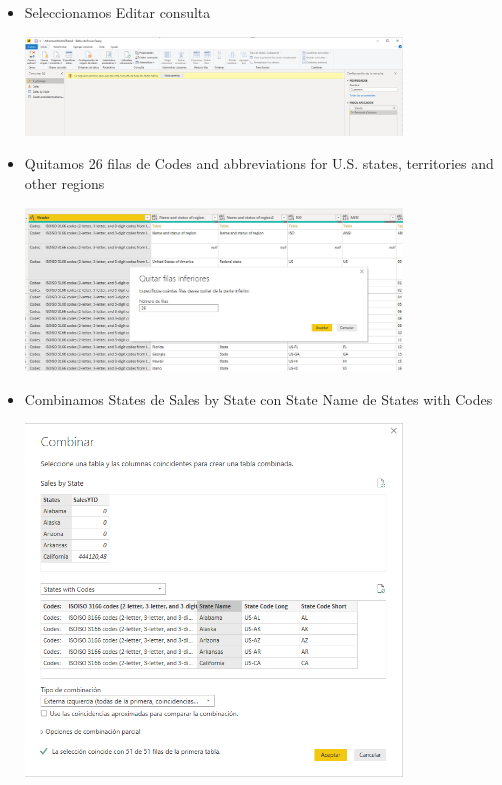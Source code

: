 \begin{itemize}
	\item Seleccionamos Editar consulta
	\begin{center}
	\includegraphics[width=10cm]{./Imagenes/Captura3-4} 
	\end{center}
\end{itemize}
\begin{itemize}
	\item Quitamos 26 filas de Codes and abbreviations for U.S. states, territories and other regions
	\begin{center}
	\includegraphics[width=10cm]{./Imagenes/Captura3-5} 
	\end{center}
\end{itemize} 
 \begin{itemize}
	\item Combinamos States de Sales by State con State Name de States with Codes
	\begin{center}
	\includegraphics[width=10cm]{./Imagenes/Captura3-8} 
	\end{center}
\end{itemize} 

